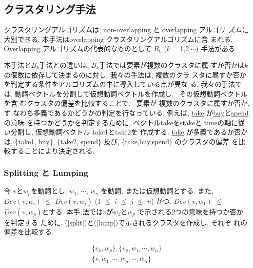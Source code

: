 \subsection{クラスタリング手法}


クラスタリングアルゴリズムは, non-overlapping と overlapping アルゴリ
ズムに大別できる.  本手法はoverlapping クラスタリングアルゴリズムに含
まれる.  Overlapping アルゴリズムの代表的なものとして 
$B_{k}$ ($k$ = 1,2,$\cdots$) 手法がある\cite{Jardine1968}. 

本手法と$B_{k}$手法との違いは, $B_{k}$手法では要素が複数のクラスタに属
すか否かは$k$の個数に依存して決まるのに対し, 我々の手法は, 複数のクラ
スタに属すか否かを判定する条件をアルゴリズムの中に導入している点が異な
る.  我々の手法では, 動詞ベクトルを分割して仮想動詞ベクトルを作成し, 
\ その仮想動詞ベクトルを含
むクラスタの偏差を比較することで, \ 要素が 複数のクラスタに属すか否か, す
なわち多義であるかどうかの判定を行なっている.  例えば,
\underline{take} が\underline{buy}\hspace{-0.1mm}と\underline{spend}\hspace{-0.1mm}の意味
を持つかどうかを判定するために, ベクトル\hspace{-0.1mm}\underline{take}\hspace{-0.1mm}を\underline{stake}\hspace{-0.1mm}と
\underline{time}\hspace{-0.1mm}の軸に従い分割し, 仮想動詞ベクトル {\sf take1}と{\sf take2}を
作成する.  \underline{take} が多義であるか否かは, \{{\sf take1},
buy\}, \{{\sf take2}, spend\} 及び, \{take,buy,spend\} のクラスタの偏差
を比較することにより決定される.

\subsubsection{Splitting と Lumping}

今 $v$と$w_{p}$を動詞とし, $w_{1}$, $\cdots$, $w_{n}$ を動詞, または仮想動詞とする.
また, $Dev(v, w_{i})$ $\leq$ $Dev(v, w_{j})$ (1 $\leq$ $i$ $\leq$ $j$
$\leq$ $n$) かつ, $Dev(v, w_{1})$ $\leq$ $Dev(v, w_{p})$とする.  本手
法では$v$が$w_{1}$と$w_{p}$ で示される2つの意味を持つか否かを判定する
ために, (\ref{split})と(\ref{lump})で示されるクラスタを作成し, それぞ
れの偏差を比較する.

\begin{eqnarray}
\{v_{x}, w_{p}\}, \{v_{y}, w_{1}, \cdots, w_{n}\} \label{split} \\
\{v, w_{1}, \cdots, w_{p}, \cdots, w_{n}\} \label{lump}
\end{eqnarray}

